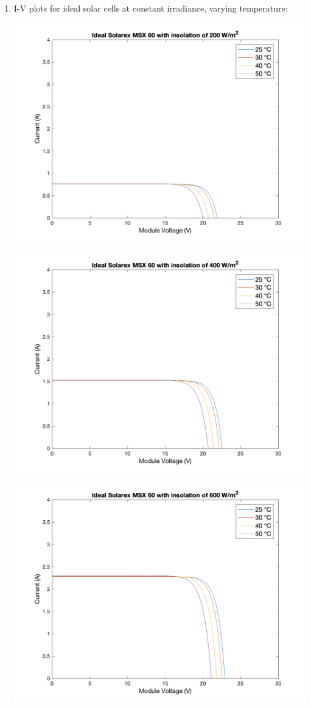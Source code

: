 \documentclass[fleqn]{article}
\begin{document}
\begin{enumerate}
\item
  I-V plots for ideal solar cells at constant irradiance, varying temperature:
  \begin{center}
    \includegraphics[width=0.9\linewidth]{200W-i.png}
  \end{center}
  \begin{center}
    \includegraphics[width=0.9\linewidth]{400W-i.png}
  \end{center}
  \begin{center}
    \includegraphics[width=0.9\linewidth]{600W-i.png}

\end{center}
\end{enumerate}
\end{document}
